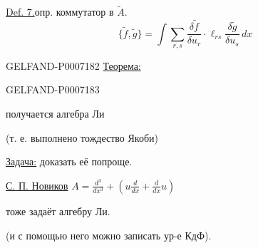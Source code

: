 \underline{Def. 7.}\quad опр. коммутатор в \(\widetilde A\).
\[
\{\widetilde f,\widetilde g\}
=\int\sum_{r,s}\frac{\delta\widetilde f}{\delta u_r}\cdot
\ell_{rs}\frac{\delta\widetilde g}{\delta u_s}\,dx
\]

\par\endgroup
\begin{GelfandAdjacentEvidence}{GELFAND-P000718}{2}
\underline{Теорема:}
\end{GelfandAdjacentEvidence}
\begin{GelfandAdjacentEvidence}{GELFAND-P000718}{3}

получается алгебра Ли
\end{GelfandAdjacentEvidence}

(т. е. выполнено тождество Якоби)

\underline{Задача:} доказать её попроще.

\underline{С. П. Новиков}\qquad
\(A=\frac{d^3}{dx^3}+\left(u\frac{d}{dx}+\frac{d}{dx}u\right)\)

тоже задаёт алгебру Ли.

(и с помощью него можно записать ур-е КдФ).


